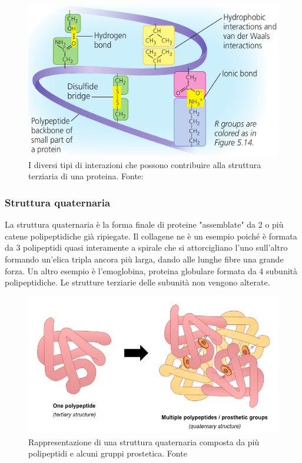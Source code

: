 \begin{figure}[!htp]
	\centering
	\includegraphics[scale=0.35]{images/interazioni-proteine.png}
	\caption{I diversi tipi di interazioni che possono contribuire alla struttura terziaria di una proteina. Fonte: \cite{campbell}}
	\label{fig:interazioni-proteine}
\end{figure}

\subsubsection{Struttura quaternaria}
La struttura quaternaria è la forma finale di proteine "assemblate" da 2 o più catene polipeptidiche già ripiegate. Il collagene ne è un esempio poiché è formata da 3 polipeptidi quasi interamente a spirale che si attorcigliano l'uno sull'altro formando un'elica tripla ancora più larga, dando alle lunghe fibre una grande forza. Un altro esempio è l'emoglobina, proteina globulare formata da 4 subunità polipeptidiche. Le strutture terziarie delle subunità non vengono alterate.

\begin{figure}[!htb]
	\centering
	\includegraphics[scale=0.35]{images/quaternary-structure_med.jpeg}
	\caption{Rappresentazione di una struttura quaternaria composta da più polipeptidi e alcuni gruppi prostetica. Fonte \cite{proteinStrucBioNinja}}
	\label{fig:struttura-quaternaria}
\end{figure}

